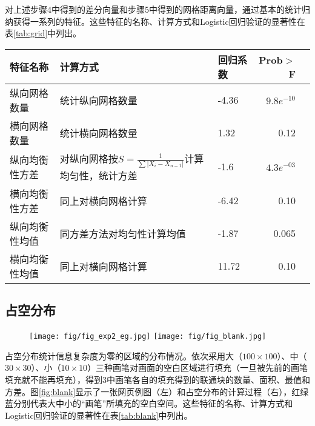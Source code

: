 对上述步骤4中得到的差分向量和步骤5中得到的网格距离向量，通过基本的统计归纳获得一系列的特征。这些特征的名称、计算方式和Logistic回归验证的显著性在表\ref{tab:grid}中列出。

\begin{table}[H]
  \centering
  \small
  \begin{tabular}{lllrr}
    \hline
     特征名称 & 计算方式 & 回归系数 & Prob$>$F \\
    \hline
    纵向网格数量 & 统计纵向网格数量 & -4.36 & $9.8e^{-10}$\\
    横向网格数量 & 统计横向网格数量 & 1.32 & 0.12\\ %
    纵向均衡性方差 & 对纵向网格按$S = \frac{1}{\sum | X_i - X_{n-1}|}$计算均匀性，统计方差 & -1.6 & $4.3e^{-03}$\\
    横向均衡性方差 & 同上对横向网格计算 & -6.42 & 0.10\\
    纵向均衡性均值 & 同方差方法对均匀性计算均值 & -1.87 & 0.065\\
    横向均衡性均值 & 同上对横向网格计算 & 11.72 & 0.10\\
    \hline
  \end{tabular}
\end{table}

\subsection{占空分布}
\begin{figure}[H]
  \texttt{[image: fig/fig\_exp2\_eg.jpg]}
  \texttt{[image: fig/fig\_blank.jpg]}
\end{figure}
占空分布统计信息复杂度为零的区域的分布情况。依次采用大（$100\times100$）、中（$30\times30$）、小（$10\times10$）三种画笔对画面的空白区域进行填充（一旦被先前的画笔填充就不能再填充），得到3中画笔各自的填充得到的联通块的数量、面积、最值和方差。图\ref{fig:blank}显示了一张网页例图（左）和占空分布的计算过程（右），红绿蓝分别代表大中小的“画笔”所填充的空白空间。这些特征的名称、计算方式和Logistic回归验证的显著性在表\ref{tab:blank}中列出。

